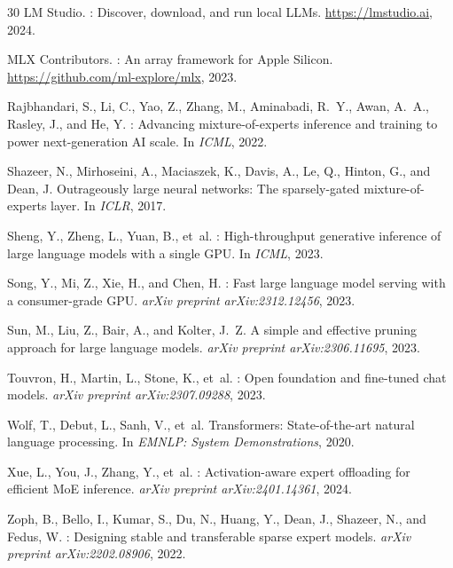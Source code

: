 \documentclass[11pt,a4paper]{article}
\begin{document}
\begin{thebibliography}{30}
{LM Studio}.
: Discover, download, and run local {LLMs}.
\newblock \url{https://lmstudio.ai}, 2024.

{MLX Contributors}.
: An array framework for Apple Silicon.
\newblock \url{https://github.com/ml-explore/mlx}, 2023.

Rajbhandari, S., Li, C., Yao, Z., Zhang, M., Aminabadi, R.~Y., Awan, A.~A.,
  Rasley, J., and He, Y.
: Advancing mixture-of-experts inference and training
  to power next-generation {AI} scale.
\newblock In \emph{ICML}, 2022.

Shazeer, N., Mirhoseini, A., Maciaszek, K., Davis, A., Le, Q., Hinton, G.,
  and Dean, J.
\newblock Outrageously large neural networks: The sparsely-gated
  mixture-of-experts layer.
\newblock In \emph{ICLR}, 2017.

Sheng, Y., Zheng, L., Yuan, B., et~al.
: High-throughput generative inference of large language
  models with a single {GPU}.
\newblock In \emph{ICML}, 2023.

Song, Y., Mi, Z., Xie, H., and Chen, H.
: Fast large language model serving with a
  consumer-grade {GPU}.
\newblock \emph{arXiv preprint arXiv:2312.12456}, 2023.

Sun, M., Liu, Z., Bair, A., and Kolter, J.~Z.
\newblock A simple and effective pruning approach for large language models.
\newblock \emph{arXiv preprint arXiv:2306.11695}, 2023.

Touvron, H., Martin, L., Stone, K., et~al.
: Open foundation and fine-tuned chat models.
\newblock \emph{arXiv preprint arXiv:2307.09288}, 2023.

Wolf, T., Debut, L., Sanh, V., et~al.
\newblock Transformers: State-of-the-art natural language processing.
\newblock In \emph{EMNLP: System Demonstrations}, 2020.

Xue, L., You, J., Zhang, Y., et~al.
: Activation-aware expert offloading for efficient
  {MoE} inference.
\newblock \emph{arXiv preprint arXiv:2401.14361}, 2024.

Zoph, B., Bello, I., Kumar, S., Du, N., Huang, Y., Dean, J., Shazeer, N.,
  and Fedus, W.
: Designing stable and transferable sparse expert models.
\newblock \emph{arXiv preprint arXiv:2202.08906}, 2022.

\end{thebibliography}
\end{document}
